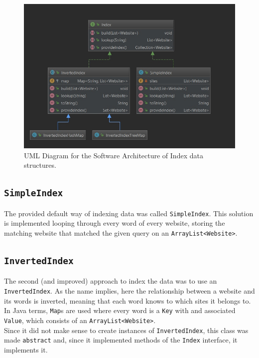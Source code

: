\begin{figure}[!h]
    \centering
    \includegraphics[width=\textwidth]{figures/Diagram_InvertedIndices}
    \caption{UML Diagram for the Software Architecture of Index data structures.}
    \label{fig:Index:uml}
\end{figure}

\subsection{{\tt SimpleIndex}}
The provided default way of indexing data was called {\tt SimpleIndex}. This solution is implemented looping through every word of every website, storing the matching website that matched the given query on an {\tt ArrayList<Website>}.\\

\subsection{{\tt InvertedIndex}}
The second (and improved) approach to index the data was to use an {\tt InvertedIndex}. As the name implies, here the relationship between a website and its words is inverted, meaning that each word knows to which sites it belongs to. In Java terms, {\tt Map}s are used where every word is a {\tt Key} with and associated {\tt Value}, which consists of an {\tt ArrayList<Website>}.\\
Since it did not make sense to create instances of {\tt InvertedIndex}, this class was made {\tt abstract} and, since it implemented methods of the {\tt Index} interface, it implements it.

